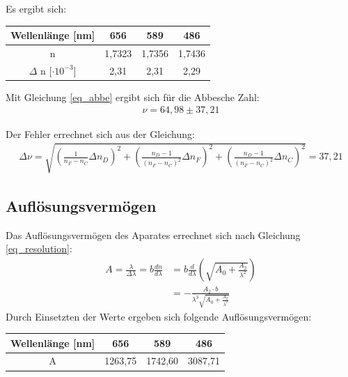 Es ergibt sich:

\begin{table}[H]
\begin{tabular}{c|c|c|c}
Wellenlänge [nm]&	656 &	589 &	486\\ \hline
n &	1,7323 &	1,7356 &	1,7436\\ \hline
$\Delta$ n [$\cdot 10^{-3}$] & 2,31 & 2,31 & 2,29 
\end{tabular} 
\end{table}

Mit Gleichung \eqref{eq_abbe} ergibt sich für die Abbesche Zahl:
\begin{align*}
\nu = 64,98 \pm 37,21
\end{align*}

Der Fehler errechnet sich aus der Gleichung:
\begin{align*}
\Delta \nu = \sqrt{\left(\frac{1}{n_F-n_C}\Delta n_D\right)^2 + \left(\frac{n_D-1}{(n_F-n_C)^2}\Delta n_F\right)^2 + \left(\frac{n_D-1}{(n_F-n_C)^2}\Delta n_C\right)^2} = 37,21
\end{align*}

\subsection{Auflösungsvermögen}
Das Auflösungsvermögen des Aparates errechnet sich nach Gleichung \eqref{eq_resolution}:
\begin{align*}
A = \frac{\lambda}{\Delta \lambda} = b\frac{dn}{d\lambda} &= b \frac{d}{d\lambda}\left(\sqrt{A_0 + \frac{A_2}{\lambda^2}}\right)\\
 &= -\frac{A_2 \cdot b}{\lambda^3\sqrt{A_0+\frac{A_2}{\lambda^2}}}
\end{align*}
Durch Einsetzten der Werte ergeben sich folgende Auflösungsvermögen:
\begin{table}[H]
\begin{tabular}{c|c|c|c}
Wellenlänge [nm]&	656 &	589 &	486\\ \hline
A &	1263,75 &1742,60 &3087,71
\\
\end{tabular} 
\end{table}
